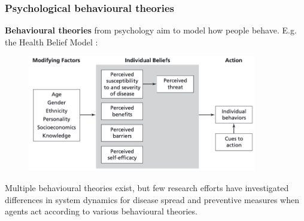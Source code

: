 \documentclass[8pt]{beamer}
\begin{document}
\begin{frame}
\frametitle{Psychological behavioural theories}


\textbf{Behavioural theories} from psychology aim to model how people behave. E.g. the Health Belief Model \cite{champion_health_2015}:

\begin{figure}
    \centering
    \includegraphics[width=10cm]{img/hbm.png}
\end{figure}

Multiple behavioural theories exist, but few research efforts have investigated differences in system dynamics for disease spread and preventive measures when agents act according to various behavioural theories.

\end{frame}




\end{document}
